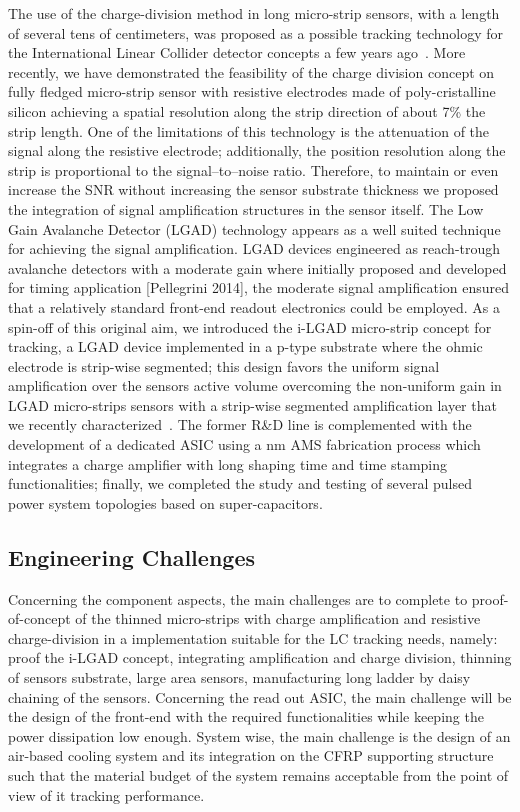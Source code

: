 The use of the charge-division method in long micro-strip sensors, with a length of several tens of centimeters, was proposed as a possible tracking technology for the International Linear Collider detector concepts a few years ago~\cite{Carman:2011zz}. More recently, we have demonstrated \cite{2012JInst...7.2005B,Bassignana2013186,Curras:ICHEP2014} the feasibility of the charge division concept on fully fledged micro-strip sensor with resistive electrodes made of poly-cristalline silicon achieving a spatial resolution along the strip direction of about 7\% the strip length. One of the limitations of this technology is the attenuation of the signal along the resistive electrode; additionally, the position resolution along the strip is proportional to the signal--to--noise ratio. Therefore, to maintain or even increase the SNR without increasing the sensor substrate thickness we proposed the integration of signal amplification structures in the sensor itself. The Low Gain Avalanche Detector (LGAD) technology appears as a well suited technique for achieving the signal amplification.
LGAD devices engineered as reach-trough avalanche detectors with a moderate gain where initially proposed and developed for timing application [Pellegrini 2014], the moderate signal amplification ensured that a relatively standard front-end readout electronics could be employed. As a spin-off of this original aim, we introduced the i-LGAD micro-strip concept for tracking, a LGAD device implemented in a p-type substrate where the ohmic electrode is strip-wise segmented; this design favors the uniform signal amplification over the sensors active volume overcoming the non-uniform gain in LGAD micro-strips sensors with a strip-wise segmented amplification layer that we recently characterized~\cite{Pellegrini:Hiroshima2015,Vila:LCWS2015}.
The former R\&D line is complemented with the development of a dedicated ASIC using a \unit[180]{nm} AMS fabrication process which integrates a charge amplifier with long shaping time and time stamping functionalities; finally, we completed the study and testing of several pulsed power system topologies based on super-capacitors.

\subsection{Engineering Challenges}
Concerning the component aspects, the main challenges are to complete to proof-of-concept of the thinned micro-strips with charge amplification and resistive charge-division in a implementation suitable for the LC tracking needs, namely:  proof the i-LGAD concept, integrating amplification and charge division, thinning of sensors substrate, large area sensors, manufacturing long ladder by daisy chaining of the sensors. Concerning the read out ASIC, the main challenge will be the design of the front-end with the required functionalities while keeping the power dissipation low enough.
System wise, the main challenge is the design of an air-based cooling system and its integration on the CFRP supporting structure such that the material budget of the system remains acceptable from the point of view of it tracking performance.

